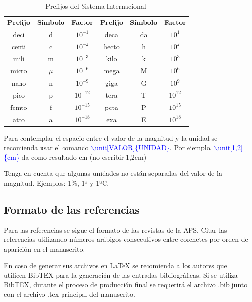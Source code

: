 \documentclass{analesafa}
\begin{document}
\begin{table}[ht]
\caption{Prefijos del Sistema Internacional. }
\label{tab_03}
    \centering
    \small               %
    \begin{tabular}{|c|c|c|c|c|c|}
    \hline
    \centering
    \textbf{Prefijo} & \textbf{Símbolo} & \textbf{Factor} & \textbf{Prefijo} & \textbf{Símbolo} & \textbf{Factor}   \\ 
    \thickhline
    deci & d & $10^{-1}$ & deca & da &  $10^{1}$ \\ 
    \hline
    centi & c & $10^{-2}$ & hecto & h &  $10^{2}$  \\ 
    \hline
    mili & m & $10^{-3}$ & kilo & k &  $10^{3}$  \\
    \hline
    micro & $\mu$ & $10^{-6}$ & mega & M &  $10^{6}$  \\
    \hline
    nano & n & $10^{-9}$ & giga & G &  $10^{9}$  \\
    \hline
    pico & p & $10^{-12}$ & tera & T &  $10^{12}$   \\
    \hline
    femto & f & $10^{-15}$ & peta & P &  $10^{15}$  \\
    \hline
    atto & a & $10^{-18}$ & exa & E &  $10^{18}$   \\
    \hline
    \end{tabular}
\end{table}

\normalsize

Para contemplar el espacio entre el valor de la magnitud y la unidad se recomienda usar el comando 
\textcolor{Blue}{\textsf{$\backslash$unit[VALOR]\{UNIDAD\}}}. Por ejemplo, \textcolor{Blue}{\textsf{$\backslash$unit[1,2]\{cm\}}}  da como resultado \unit[1,2]{cm} (no escribir 1,2cm). 

Tenga en cuenta que algunas unidades no están separadas del valor de la magnitud. Ejemplos: 1$\%$, 1º y 1ºC.


\subsection{Formato de las referencias} 
Para las referencias se sigue el formato de las revistas de la APS. 
Citar las referencias utilizando números arábigos consecutivos entre corchetes por orden de aparición en el manuscrito. 

En caso de generar sus archivos en \LaTeX{} se recomienda a los autores que utilicen BibTEX para la generación de las entradas bibliográficas. Si se utiliza BibTEX, durante el proceso de producción final se requerirá el archivo .bib  junto con el archivo .tex principal del manuscrito.
\end{document}
